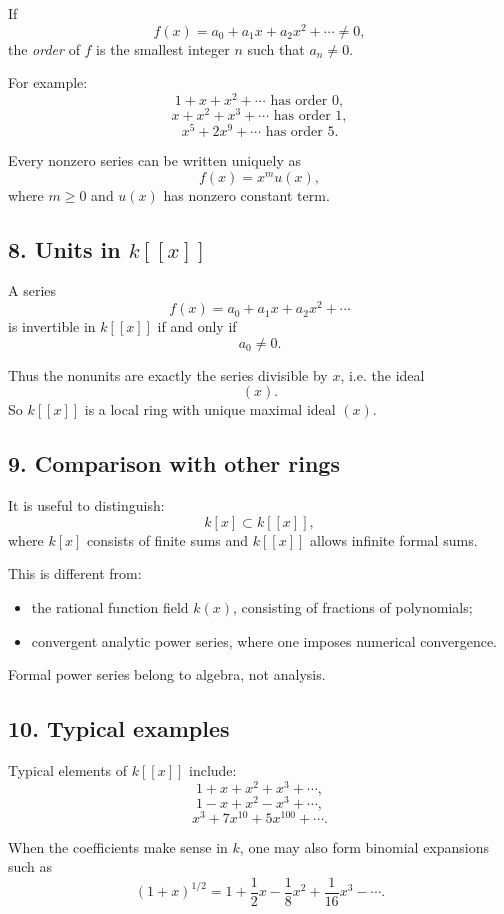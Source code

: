 \documentclass[12pt,a4paper]{article}
\theoremstyle{plain}
\theoremstyle{definition}      %
\begin{document}
	If
	\[
	f(x)=a_0+a_1x+a_2x^2+\cdots \neq 0,
	\]
	the \emph{order} of \(f\) is the smallest integer \(n\) such that \(a_n\neq 0\).
	
	For example:
	\[
	1+x+x^2+\cdots \text{ has order }0,
	\]
	\[
	x+x^2+x^3+\cdots \text{ has order }1,
	\]
	\[
	x^5+2x^9+\cdots \text{ has order }5.
	\]
	
	Every nonzero series can be written uniquely as
	\[
	f(x)=x^m u(x),
	\]
	where \(m\ge 0\) and \(u(x)\) has nonzero constant term.
	
	\subsection*{8. Units in \(k[[x]]\)}
	
	A series
	\[
	f(x)=a_0+a_1x+a_2x^2+\cdots
	\]
	is invertible in \(k[[x]]\) if and only if
	\[
	a_0\neq 0.
	\]
	
	Thus the nonunits are exactly the series divisible by \(x\), i.e. the ideal
	\[
	(x).
	\]
	So \(k[[x]]\) is a local ring with unique maximal ideal \((x)\).
	
	\subsection*{9. Comparison with other rings}
	
	It is useful to distinguish:
	\[
	k[x] \subset k[[x]],
	\]
	where \(k[x]\) consists of finite sums and \(k[[x]]\) allows infinite formal sums.
	
	This is different from:
	\begin{itemize}
		\item the rational function field \(k(x)\), consisting of fractions of polynomials;
		\item convergent analytic power series, where one imposes numerical convergence.
	\end{itemize}
	
	Formal power series belong to algebra, not analysis.
	
	\subsection*{10. Typical examples}
	
	Typical elements of \(k[[x]]\) include:
	\[
	1+x+x^2+x^3+\cdots,
	\]
	\[
	1-x+x^2-x^3+\cdots,
	\]
	\[
	x^3+7x^{10}+5x^{100}+\cdots.
	\]
	
	When the coefficients make sense in \(k\), one may also form binomial expansions such as
	\[
	(1+x)^{1/2}=1+\frac12x-\frac18x^2+\frac1{16}x^3-\cdots.
	\]
	
\end{document}
